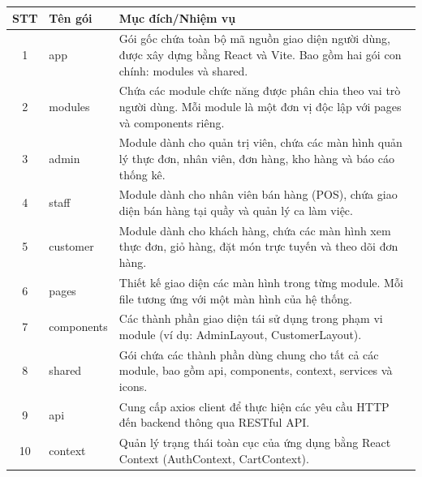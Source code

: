 \documentclass[../20232006p.tex]{subfiles}
\begin{document}
\begin{table}[H]
    \centering
    \label{tab:package_desc}
    \begin{tabular}{|c|p{2.5cm}|p{8.5cm}|}
        \hline
        \textbf{STT} & \textbf{Tên gói} & \textbf{Mục đích/Nhiệm vụ}                                                                                                          \\ \hline
        1            & app              & Gói gốc chứa toàn bộ mã nguồn giao diện người dùng, được xây dựng bằng React và Vite. Bao gồm hai gói con chính: modules và shared. \\ \hline
        2            & modules          & Chứa các module chức năng được phân chia theo vai trò người dùng. Mỗi module là một đơn vị độc lập với pages và components riêng.   \\ \hline
        3            & admin            & Module dành cho quản trị viên, chứa các màn hình quản lý thực đơn, nhân viên, đơn hàng, kho hàng và báo cáo thống kê.               \\ \hline
        4            & staff            & Module dành cho nhân viên bán hàng (POS), chứa giao diện bán hàng tại quầy và quản lý ca làm việc.                                  \\ \hline
        5            & customer         & Module dành cho khách hàng, chứa các màn hình xem thực đơn, giỏ hàng, đặt món trực tuyến và theo dõi đơn hàng.                      \\ \hline
        6            & pages            & Thiết kế giao diện các màn hình trong từng module. Mỗi file tương ứng với một màn hình của hệ thống.                                \\ \hline
        7            & components       & Các thành phần giao diện tái sử dụng trong phạm vi module (ví dụ: AdminLayout, CustomerLayout).                                     \\ \hline
        8            & shared           & Gói chứa các thành phần dùng chung cho tất cả các module, bao gồm api, components, context, services và icons.                      \\ \hline
        9            & api              & Cung cấp axios client để thực hiện các yêu cầu HTTP đến backend thông qua RESTful API.                                              \\ \hline
        10           & context          & Quản lý trạng thái toàn cục của ứng dụng bằng React Context (AuthContext, CartContext).                                             \\ \hline

\end{tabular}
\end{table}
\end{document}
